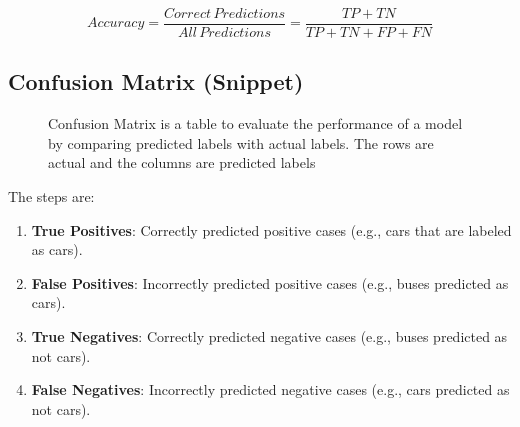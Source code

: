 \documentclass{article}
\begin{document}
\[ Accuracy = \frac{Correct\,Predictions}{All\,Predictions} = \frac{TP+TN}{TP+TN+FP+FN} \]
\subsection{Confusion Matrix (Snippet)}
\begin{figure}[H]
\centering
{}
    \caption{Confusion Matrix is a table to evaluate the performance of a model by comparing predicted labels with actual labels. The rows are actual and the columns are predicted labels}
\end{figure}
    The steps are:
\begin{enumerate}
    \item \textbf{True Positives}: Correctly predicted positive cases (e.g., cars that are labeled as cars).
\item \textbf{False Positives}: Incorrectly predicted positive cases (e.g., buses predicted as cars).
\item \textbf{True Negatives}: Correctly predicted negative cases (e.g., buses predicted as not cars).
\item \textbf{False Negatives}: Incorrectly predicted negative cases (e.g., cars predicted as not cars).
\end{enumerate}
\end{document}
